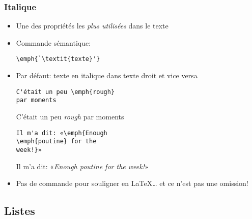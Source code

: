 \begin{frame}[fragile]
  \frametitle{Italique}
  \begin{itemize}
  \item<1-> Une des propriétés les \emph{plus utilisées} dans le texte
    \vfill
  \item<1-> Commande sémantique:
\begin{lstlisting}
\emph{`\textit{texte}'}
\end{lstlisting}
    \vfill
  \item<2-> Par défaut: texte en italique dans texte droit et vice versa
    \begin{demo}
      \small
      \begin{texample}[0.48\linewidth]
\begin{lstlisting}
C'était un peu \emph{rough}
par moments
\end{lstlisting}
        \producing
        C'était un peu \emph{rough} par moments
      \end{texample}

      \begin{texample}[0.48\linewidth]
\begin{lstlisting}
Il m'a dit: «\emph{Enough
\emph{poutine} for the
week!}»
\end{lstlisting}
        \producing
        Il m'a dit: «\emph{Enough \emph{poutine} for the week!}»
      \end{texample}
    \end{demo}
  \item<3-> Pas de commande pour souligner en {\LaTeX\dots} et ce n'est
    pas une omission!
  \end{itemize}
\end{frame}

\subsection{Listes}

